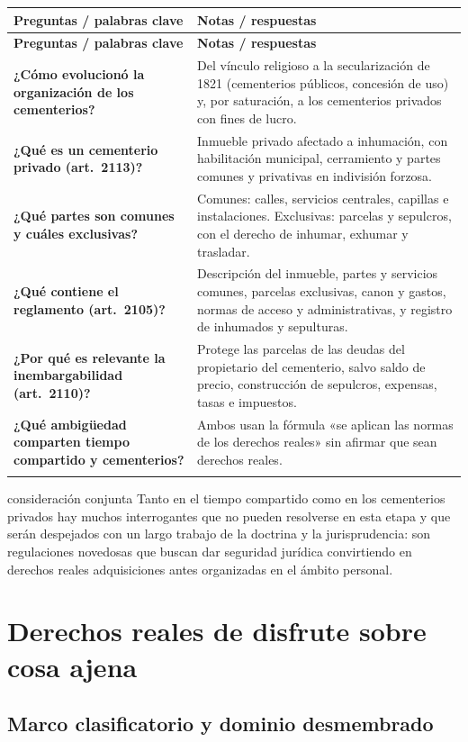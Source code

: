 \documentclass[12pt,oneside]{book}
\makeatletter
\renewcommand{\arraystretch}{1.25}
\newcommand{\cq}[2]{\textbf{#1} & #2 \\[0.45em]}
\newcommand{\cornell}[3]{%
\par\bigskip\noindent{\large\bfseries Cuadro Cornell: #1}\par\nopagebreak\smallskip
\begingroup
\small
\renewcommand{\arraystretch}{1.15}
\begin{longtable}{@{}>{\raggedright\arraybackslash}p{0.26\textwidth}>{\raggedright\arraybackslash}p{0.66\textwidth}@{}}
\toprule
\textbf{Preguntas / palabras clave} & \textbf{Notas / respuestas} \\
\midrule
\endfirsthead
\toprule
\textbf{Preguntas / palabras clave} & \textbf{Notas / respuestas} \\
\midrule
\endhead
#2
\midrule
\multicolumn{2}{@{}p{\dimexpr0.92\textwidth+2\tabcolsep\relax}@{}}{\vspace{0.2em}\textbf{Resumen.} #3\vspace{0.2em}} \\
\bottomrule
\end{longtable}
\endgroup
}
\makeatother
\begin{document}
\cornell{cementerios privados}{
\cq{¿Cómo evolucionó la organización de los cementerios?}{Del vínculo religioso a la secularización de 1821 (cementerios públicos, concesión de uso) y, por saturación, a los cementerios privados con fines de lucro.}
\cq{¿Qué es un cementerio privado (art.~2113)?}{Inmueble privado afectado a inhumación, con habilitación municipal, cerramiento y partes comunes y privativas en indivisión forzosa.}
\cq{¿Qué partes son comunes y cuáles exclusivas?}{Comunes: calles, servicios centrales, capillas e instalaciones. Exclusivas: parcelas y sepulcros, con el derecho de inhumar, exhumar y trasladar.}
\cq{¿Qué contiene el reglamento (art.~2105)?}{Descripción del inmueble, partes y servicios comunes, parcelas exclusivas, canon y gastos, normas de acceso y administrativas, y registro de inhumados y sepulturas.}
\cq{¿Por qué es relevante la inembargabilidad (art.~2110)?}{Protege las parcelas de las deudas del propietario del cementerio, salvo saldo de precio, construcción de sepulcros, expensas, tasas e impuestos.}
\cq{¿Qué ambigüedad comparten tiempo compartido y cementerios?}{Ambos usan la fórmula «se aplican las normas de los derechos reales» sin afirmar que sean derechos reales.}
}{El cementerio privado es un inmueble afectado a la inhumación, con partes comunes en indivisión forzosa y parcelas exclusivas inembargables, bajo poder de policía mortuoria estatal y normas de consumo. Como el tiempo compartido, plantea el interrogante de si es un derecho real o solo se le aplican sus normas.}

\begin{conceptoclave}{consideración conjunta}
Tanto en el tiempo compartido como en los cementerios privados hay muchos interrogantes que no pueden resolverse en esta etapa y que serán despejados con un largo trabajo de la doctrina y la jurisprudencia: son regulaciones novedosas que buscan dar seguridad jurídica convirtiendo en derechos reales adquisiciones antes organizadas en el ámbito personal.
\end{conceptoclave}


\part{Derechos reales de disfrute sobre cosa ajena}

\chapter[Marco clasificatorio y dominio desmembrado]{Marco clasificatorio y dominio desmembrado}\label{cap:marco}
\end{document}
